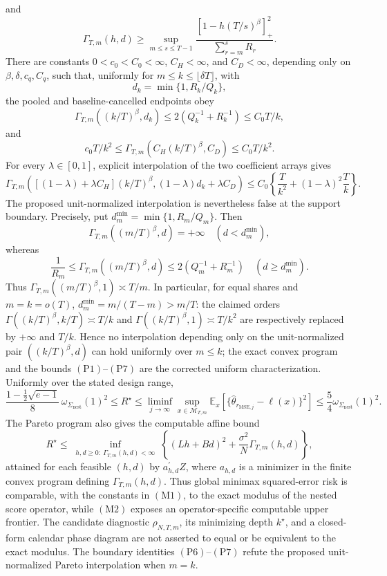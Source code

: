 and
\[
 \Gamma_{T,m}(h,d)\ge
 \sup_{m\le s\le T-1}
 \frac{[1-h(T/s)^\beta]_+^2}{\sum_{r=m}^sR_r}.
 \tag{P2}
\]
There are constants \(0<c_0<C_0<\infty\), \(C_H<\infty\), and \(C_D<\infty\), depending only on \(\beta,\delta,c_q,C_q\), such that, uniformly for \(m\le k\le\lfloor\delta T\rfloor\), with
\[
 d_k=\min\{1,R_k/Q_k\},
\]
the pooled and baseline-cancelled endpoints obey
\[
 \Gamma_{T,m}((k/T)^\beta,d_k)
 \le2(Q_k^{-1}+R_k^{-1})\le C_0T/k,
 \tag{P3}
\]
and
\[
 c_0T/k^2\le
 \Gamma_{T,m}(C_H(k/T)^\beta,C_D)
 \le C_0T/k^2.
 \tag{P4}
\]
For every \(\lambda\in[0,1]\), explicit interpolation of the two coefficient arrays gives
\[
 \Gamma_{T,m}\!\left(
 [(1-\lambda)+\lambda C_H](k/T)^\beta,
 (1-\lambda)d_k+\lambda C_D
 \right)
 \le C_0\left\{\frac{T}{k^2}+(1-\lambda)^2\frac{T}{k}\right\}.
 \tag{P5}
\]
The proposed unit-normalized interpolation is nevertheless false at the support boundary.  Precisely, put \(d_m^{\min}=\min\{1,R_m/Q_m\}\).  Then
\[
 \Gamma_{T,m}((m/T)^\beta,d)=+\infty\quad(d<d_m^{\min}),
 \tag{P6}
\]
whereas
\[
 \frac1{R_m}\le
 \Gamma_{T,m}((m/T)^\beta,d)
 \le2(Q_m^{-1}+R_m^{-1})
 \quad(d\ge d_m^{\min}).
 \tag{P7}
\]
Thus \(\Gamma_{T,m}((m/T)^\beta,1)\asymp T/m\).  In particular, for equal shares and \(m=k=o(T)\), \(d_m^{\min}=m/(T-m)>m/T\): the claimed orders \(\Gamma((k/T)^\beta,k/T)\asymp T/k\) and \(\Gamma((k/T)^\beta,1)\asymp T/k^2\) are respectively replaced by \(+\infty\) and \(T/k\).  Hence no interpolation depending only on the unit-normalized pair \(((k/T)^\beta,d)\) can hold uniformly over \(m\le k\); the exact convex program and the bounds \((\mathrm{P1})\)--\((\mathrm{P7})\) are the corrected uniform characterization.
Uniformly over the stated design range,
\[
 \frac{1-\frac12\sqrt{e-1}}8\,
 \omega_{\Sigma_{\mathrm{nest}}}(1)^2
 \le R^{\star}
 \le\liminf_{j\to\infty}\sup_{x\in\mathcal M_{T,m}}
 \mathbb E_x\!\left[
 \{\widehat\theta_{r_{\mathrm{MSE},j}}-\ell(x)\}^2
 \right]
 \le\frac54\omega_{\Sigma_{\mathrm{nest}}}(1)^2.
 \tag{M1}
\]
The Pareto program also gives the computable affine bound
\[
 R^{\star}\le
 \inf_{\substack{h,d\ge0:\ \Gamma_{T,m}(h,d)<\infty}}
 \left\{(Lh+Bd)^2+\frac{\sigma^2}{N}\Gamma_{T,m}(h,d)\right\},
 \tag{M2}
\]
attained for each feasible \((h,d)\) by \(a_{h,d}^{\prime}Z\), where \(a_{h,d}\) is a minimizer in the finite convex program defining \(\Gamma_{T,m}(h,d)\).  Thus global minimax squared-error risk is comparable, with the constants in \((\mathrm{M1})\), to the exact modulus of the nested score operator, while \((\mathrm{M2})\) exposes an operator-specific computable upper frontier.  The candidate diagnostic \(\rho_{N,T,m}\), its minimizing depth \(k^{\star}\), and a closed-form calendar phase diagram are not asserted to equal or be equivalent to the exact modulus.  The boundary identities \((\mathrm{P6})\)--\((\mathrm{P7})\) refute the proposed unit-normalized Pareto interpolation when \(m=k\).
